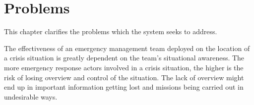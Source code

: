\chapter{Problems}
\label{chap:problems}
This chapter clarifies the problems which the system seeks to address. 

The effectiveness of an emergency management team deployed on the location of a crisis situation is greatly dependent on the team's situational awareness. The more emergency response actors involved in a crisis situation, the higher is the risk of losing overview and control of the situation. The lack of overview might end up in important information getting lost and missions being carried out in undesirable ways. 

